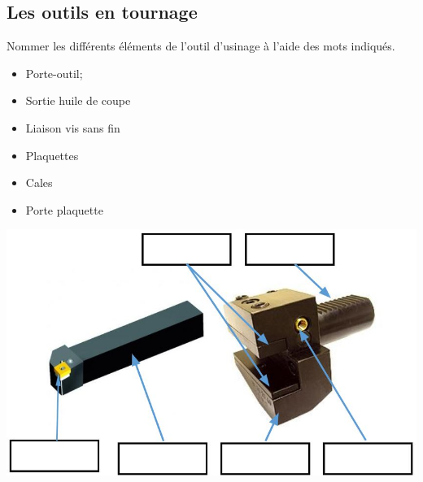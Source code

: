 \documentclass[12pt,a4paper]{article} %
\begin{document}

\newpage


\subsection{Les outils en tournage}

\begin{exo} Nommer les différents  éléments de l’outil d’usinage à l'aide des mots
indiqués. \end{exo}
\begin{minipage}{.55\linewidth}
\begin{itemize}
    \item Porte-outil;
    \item Sortie huile de coupe
    \item Liaison vis sans fin
\end{itemize} 
\end{minipage}
\begin{minipage}{.44\linewidth}
\begin{itemize}
    \item Plaquettes
    \item Cales
    \item Porte plaquette
\end{itemize} 
\end{minipage}
\includegraphics[scale=0.65]{PP1.JPG}
\end{document}

